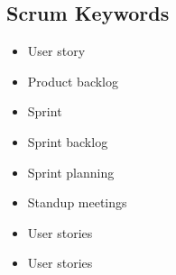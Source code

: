 \subsection{Scrum Keywords}
\begin{itemize}
\item{User story}
\item{Product backlog}
\item{Sprint}
\item{Sprint backlog}
\item{Sprint planning}
\item{Standup meetings}
\item{User stories}
\item{User stories}

\end{itemize}
